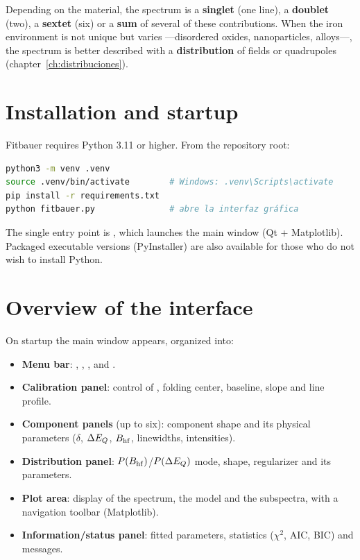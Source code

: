 Depending on the material, the spectrum is a \textbf{singlet} (one line), a
\textbf{doublet} (two), a \textbf{sextet} (six) or a \textbf{sum} of several
of these contributions. When the iron environment is not unique but varies
—disordered oxides, nanoparticles, alloys—, the spectrum is better described
with a \textbf{distribution} of fields or quadrupoles
(chapter~\ref{ch:distribuciones}).

\section{Installation and startup}

Fitbauer requires Python 3.11 or higher. From the repository root:

\begin{lstlisting}[language=bash]
python3 -m venv .venv
source .venv/bin/activate        # Windows: .venv\Scripts\activate
pip install -r requirements.txt
python fitbauer.py               # abre la interfaz gráfica
\end{lstlisting}

The single entry point is , which launches the main window
(Qt + Matplotlib). Packaged executable versions
(PyInstaller) are also available for those who do not wish to install Python.

\section{Overview of the interface}
\label{sec:panorama}

On startup the main window appears, organized into:

\begin{itemize}[nosep]
  \item \textbf{Menu bar}: , , ,
         and .
  \item \textbf{Calibration panel}: control of , folding
        center, baseline, slope and line profile.
  \item \textbf{Component panels} (up to six): component shape and its
        physical parameters ($\delta$, $\Delta E_{Q}$, $B_{\mathrm{hf}}$, linewidths, intensities).
  \item \textbf{Distribution panel}: $P(B_{\mathrm{hf}})$/$P(\Delta E_{Q})$ mode, shape,
        regularizer and its parameters.
  \item \textbf{Plot area}: display of the spectrum, the model and the
        subspectra, with a navigation toolbar (Matplotlib).
  \item \textbf{Information/status panel}: fitted parameters, statistics
        ($\chi^2$, AIC, BIC) and messages.
\end{itemize}

